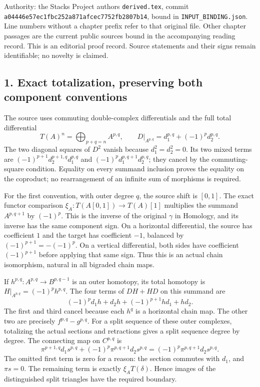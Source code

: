 \documentclass[11pt]{article}
\begin{document}
Authority:\allowbreak{} the Stacks Project authors\textquotesingle{} \texttt{derived.\allowbreak{}tex},\allowbreak{} commit \texttt{a04446e5\allowbreak{}7ec1fbc2\allowbreak{}52a871af\allowbreak{}cec7752f\allowbreak{}b2807b14},\allowbreak{} bound in \texttt{INPUT\_\allowbreak{}BINDING.\allowbreak{}json}. Line numbers without a chapter prefix refer to that original file. Other chapter passages are the current public sources bound in the accompanying reading record. This is an editorial proof record. Source statements and their signs remain identifiable; no novelty is claimed.

\subsection{\texorpdfstring{1. Exact totalization,\allowbreak{} preserving both component conventions}{1. Exact  preserving both component conventions}}\label{proofs-3487-4161-exact-totalization-preserving-both-component-conventions}

The source uses commuting double-complex differentials and the full total differential \[
T(A)^n=\bigoplus_{p+q=n}A^{p,q},\qquad
D|_{A^{p,q}}=d_1^{p,q}+(-1)^p d_2^{p,q}.
\] The two diagonal squares of \(D^2\) vanish because \(d_1^2=d_2^2=0\). Its two mixed terms are \((-1)^{p+1}d_2^{p+1,q}d_1^{p,q}\) and \((-1)^pd_1^{p,q+1}d_2^{p,q}\); they cancel by the commuting-square condition. Equality on every summand inclusion proves the equality on the coproduct; no rearrangement of an infinite sum of morphisms is required.

For the first convention,\allowbreak{} with outer degree \(q\),\allowbreak{} the source shift is \([0,1]\). The exact functor comparison \(\xi_A:T(A[0,1])\to T(A)[1]\) multiplies the summand \(A^{p,q+1}\) by \((-1)^p\). This is the inverse of the original \(\gamma\) in Homology,\allowbreak{} and its inverse has the same component sign. On a horizontal differential,\allowbreak{} the source has coefficient \(1\) and the target has coefficient \(-1\),\allowbreak{} balanced by \((-1)^{p+1}=-(-1)^p\). On a vertical differential,\allowbreak{} both sides have coefficient \((-1)^{p+1}\) before applying that same sign. Thus this is an actual chain isomorphism,\allowbreak{} natural in all bigraded chain maps.

If \(h^{p,q}:A^{p,q}\to B^{p,q-1}\) is an outer homotopy,\allowbreak{} its total homotopy is \(H|_{A^{p,q}}=(-1)^ph^{p,q}\). The four terms of \(DH+HD\) on this summand are \[
(-1)^pd_1h+d_2h+(-1)^{p+1}hd_1+hd_2.
\] The first and third cancel because each \(h^q\) is a horizontal chain map. The other two are precisely \(f^{p,q}-g^{p,q}\). For a split sequence of these outer complexes,\allowbreak{} totalizing the actual sections and retractions gives a split sequence degree by degree. The connecting map on \(C^{p,q}\) is \[
\pi^{p+1,q}d_1s^{p,q}
+(-1)^p\pi^{p,q+1}d_2s^{p,q}
=(-1)^p\pi^{p,q+1}d_2s^{p,q}.
\] The omitted first term is zero for a reason:\allowbreak{} the section commutes with \(d_1\),\allowbreak{} and \(\pi s=0\). The remaining term is exactly \(\xi_A T(\delta)\). Hence images of the distinguished split triangles have the required boundary.
\end{document}
